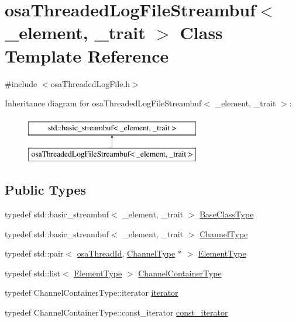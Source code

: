 \hypertarget{classosa_threaded_log_file_streambuf}{}\section{osa\+Threaded\+Log\+File\+Streambuf$<$ \+\_\+element, \+\_\+trait $>$ Class Template Reference}
\label{classosa_threaded_log_file_streambuf}


{\ttfamily \#include $<$osa\+Threaded\+Log\+File.\+h$>$}

Inheritance diagram for osa\+Threaded\+Log\+File\+Streambuf$<$ \+\_\+element, \+\_\+trait $>$\+:\begin{figure}[H]
\begin{center}
\leavevmode
\includegraphics[height=2.000000cm]{dc/d13/classosa_threaded_log_file_streambuf}
\end{center}
\end{figure}
\subsection*{Public Types}
\begin{DoxyCompactItemize}
\item 
typedef std\+::basic\+\_\+streambuf$<$ \+\_\+element, \+\_\+trait $>$ \hyperlink{classosa_threaded_log_file_streambuf_a918db063483813434ed1d8f81c3fb205}{Base\+Class\+Type}
\item 
typedef std\+::basic\+\_\+streambuf$<$ \+\_\+element, \+\_\+trait $>$ \hyperlink{classosa_threaded_log_file_streambuf_a216ca33908152519430e5456e828805f}{Channel\+Type}
\item 
typedef std\+::pair$<$ \hyperlink{classosa_thread_id}{osa\+Thread\+Id}, \hyperlink{classosa_threaded_log_file_streambuf_a216ca33908152519430e5456e828805f}{Channel\+Type} $\ast$ $>$ \hyperlink{classosa_threaded_log_file_streambuf_afe93c480e5a97ccc96aa3027a8c15ed5}{Element\+Type}
\item 
typedef std\+::list$<$ \hyperlink{classosa_threaded_log_file_streambuf_afe93c480e5a97ccc96aa3027a8c15ed5}{Element\+Type} $>$ \hyperlink{classosa_threaded_log_file_streambuf_aa02aa00f9d3dbd620e15914d5ee83fb5}{Channel\+Container\+Type}
\item 
typedef Channel\+Container\+Type\+::iterator \hyperlink{classosa_threaded_log_file_streambuf_a2f40fd9fa3cc49d0c1adfda883c35fa0}{iterator}
\item 
typedef Channel\+Container\+Type\+::const\+\_\+iterator \hyperlink{classosa_threaded_log_file_streambuf_ae7f904ba3ba23106eb4821db7db66a26}{const\+\_\+iterator}
\end{DoxyCompactItemize}
